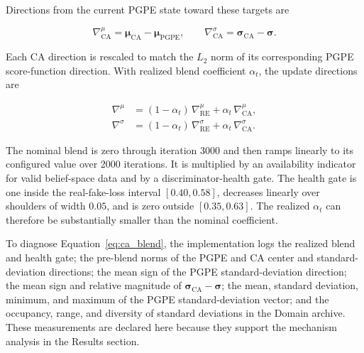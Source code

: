 Directions from the current PGPE state toward these targets are

\begin{equation}
\nabla^{\mu}_{\text{CA}}
= \boldsymbol{\mu}_{\text{CA}}-\boldsymbol{\mu}_{\text{PGPE}},
\qquad
\nabla^{\sigma}_{\text{CA}}
= \boldsymbol{\sigma}_{\text{CA}}-\boldsymbol{\sigma}.
\end{equation}

Each CA direction is rescaled to match the $L_2$ norm of its corresponding PGPE score-function direction. With realized blend coefficient $\alpha_t$, the update directions are

\begin{equation}
\begin{aligned}
\nabla^{\mu}
&=(1-\alpha_t)\,\nabla^{\mu}_{\text{RE}}
+\alpha_t\,\nabla^{\mu}_{\text{CA}},\\
\nabla^{\sigma}
&=(1-\alpha_t)\,\nabla^{\sigma}_{\text{RE}}
+\alpha_t\,\nabla^{\sigma}_{\text{CA}}.
\end{aligned}
\label{eq:ca_blend}
\end{equation}

The nominal blend is zero through iteration 3000 and then ramps linearly to its configured value over 2000 iterations. It is multiplied by an availability indicator for valid belief-space data and by a discriminator-health gate. The health gate is one inside the real-fake-loss interval $[0.40,0.58]$, decreases linearly over shoulders of width $0.05$, and is zero outside $[0.35,0.63]$. The realized $\alpha_t$ can therefore be substantially smaller than the nominal coefficient.

To diagnose Equation~\ref{eq:ca_blend}, the implementation logs the realized blend and health gate; the pre-blend norms of the PGPE and CA center and standard-deviation directions; the mean sign of the PGPE standard-deviation direction; the mean sign and relative magnitude of $\boldsymbol{\sigma}_{\text{CA}}-\boldsymbol{\sigma}$; the mean, standard deviation, minimum, and maximum of the PGPE standard-deviation vector; and the occupancy, range, and diversity of standard deviations in the Domain archive. These measurements are declared here because they support the mechanism analysis in the Results section.

